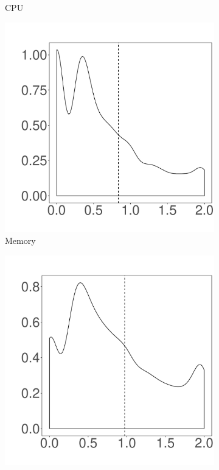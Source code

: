 \begin{figure}[t]
\begin{subfigure}{0.19\textwidth}
                \caption{CPU}
        \end{subfigure}%
        \begin{subfigure}{0.19\textwidth}
                \includegraphics[width=\linewidth]{Figures/mem-cassandra-cluster.pdf}
                \caption{Memory}
        \end{subfigure}%
        \begin{subfigure}{0.19\textwidth}
                \includegraphics[width=\linewidth]{Figures/ioread-cassandra-cluster.pdf}

\end{subfigure}
\end{figure}
